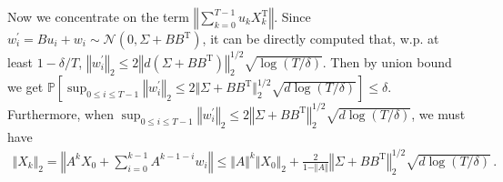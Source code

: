 \documentclass{article}
\theoremstyle{definition}
\begin{document}
Now we concentrate on the term $\left\Vert \sum_{k=0}^{T-1}u_{k}X^{\mathrm{T}}_{k}\right\Vert$. Since $w^{'}_{i}=Bu_{i}+w_{i}\sim\mathcal{N}(0,\Sigma+BB^{\mathrm{T}})$, it can be directly computed that, w.p. at least $1-\delta/T$, $\left\Vert w^{'}_{i}\right\Vert_{2}\leq 2\left\Vert d(\Sigma+BB^{\mathrm{T}})\right\Vert ^{1/2}_{2}\sqrt{\log(T/\delta)}$. Then by union bound we get $\mathbb{P}\left[\sup_{0\leq i\leq T-1}\left\Vert w^{'}_{i}\right\Vert _{2}\leq 2\Vert \Sigma+BB^{\mathrm{T}}\Vert ^{1/2}_{2}\sqrt{d\log(T/\delta)} \right]\leq \delta$. Furthermore, when $\sup_{0\leq i\leq T-1}\left\Vert w^{'}_{i}\right\Vert_{2}\leq 2\left\Vert \Sigma+BB^{\mathrm{T}}\right\Vert ^{1/2}_{2}\sqrt{d\log(T/\delta)}$, we must have 
\begin{align}\label{eq:X}
\Vert X_{k}\Vert _{2}=\left\Vert A^{k}X_{0}+\sum_{i=0}^{k-1}A^{k-1-i}w_{i}\right\Vert \leq \Vert A\Vert ^{k}\Vert X_{0}\Vert _{2}+\frac{2}{1-\Vert A\Vert }\left\Vert\Sigma+BB^{\mathrm{T}}\right\Vert^{1/2}_{2}\sqrt{d\log(T/\delta)}\,.
\end{align}
\end{document}
